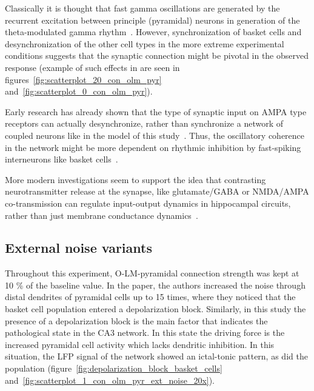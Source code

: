 Classically it is thought that fast gamma oscillations are generated by the recurrent excitation between principle (pyramidal) neurons in
generation of the theta-modulated gamma rhythm~\parencite{wangGammaOscillationSynaptic1996}. However, synchronization of basket cells and
desynchronization of the other cell types in the more extreme experimental conditions suggests that the synaptic connection might be pivotal
in the observed response (example of such effects in are seen in figures~\ref{fig:scatterplot_20_con_olm_pyr} and~\ref{fig:scatterplot_0_con_olm_pyr}).

Early research has already shown that the type of synaptic input on AMPA type receptors can actually desynchronize, rather than synchronize
a network of coupled neurons like in the model of this study~\parencite{vanvreeswijkWhenInhibitionNot1994,khazipovSynchronizationGABAergicInterneuronal1997}.
Thus, the oscillatory coherence in the network might be more dependent on rhythmic inhibition by fast-spiking interneurons
like basket cells~\parencite{lyttonSimulationsCorticalPyramidal1991}.

More modern investigations seem to support the idea that contrasting neurotransmitter release at the synapse, like glutamate/GABA or NMDA/AMPA co-transmission
can regulate input-output dynamics in hippocampal circuits, rather than just membrane
conductance dynamics~\parencite{ajibolaHypothalamicGlutamateGABA2021,micheliMechanisticModelNMDA2021}.

\subsection{External noise variants}
Throughout this experiment, O-LM-pyramidal connection strength was kept at 10 \% of the baseline value.
In the \textcite{sanjayImpairedDendriticInhibition2015} paper, the authors increased the noise through distal dendrites of pyramidal cells up to 15 times,
where they noticed that the basket cell population entered a depolarization block. Similarly, in this study the presence of a depolarization block is the main factor
that indicates the pathological state in the CA3 network. In this state the driving force is the increased pyramidal cell activity which lacks dendritic inhibition.
In this situation, the LFP signal of the network showed an ictal-tonic pattern, as did the
population (figure~\ref{fig:depolarization_block_basket_cells} and~\ref{fig:scatterplot_1_con_olm_pyr_ext_noise_20x}).

